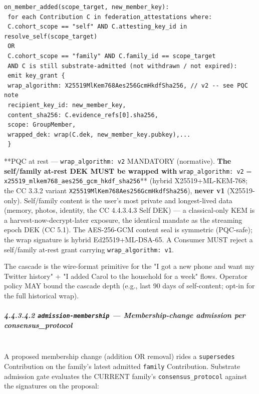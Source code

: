 \documentclass[11pt]{article}
\begin{document}
\begin{lstlisting}
on_member_added(scope_target, new_member_key):
 for each Contribution C in federation_attestations where:
 C.cohort_scope == "self" AND C.attesting_key_id in resolve_self(scope_target)
 OR
 C.cohort_scope == "family" AND C.family_id == scope_target
 AND C is still substrate-admitted (not withdrawn / not expired):
 emit key_grant {
 wrap_algorithm: X25519MlKem768Aes256GcmHkdfSha256, // v2 -- see PQC note
 recipient_key_id: new_member_key,
 content_sha256: C.evidence_refs[0].sha256,
 scope: GroupMember,
 wrapped_dek: wrap(C.dek, new_member_key.pubkey),...
 }
\end{lstlisting}

**PQC at rest — \texttt{wrap\_algorithm: v2} MANDATORY (normative).\textbf{ The self/family at-rest DEK MUST be wrapped with }\texttt{wrap\_algorithm: v2} = \texttt{x25519\_mlkem768\_aes256\_gcm\_hkdf\_sha256}** (hybrid X25519+ML-KEM-768; the CC 3.3.2 variant \texttt{X25519MlKem768Aes256GcmHkdfSha256}), \textbf{never v1} (X25519-only). Self/family content is the user's most private and longest-lived data (memory, photos, identity, the CC 4.4.3.4.3 Self DEK) — a classical-only KEM is a harvest-now-decrypt-later exposure, the identical mandate as the streaming epoch DEK (CC 5.1). The AES-256-GCM content seal is symmetric (PQC-safe); the wrap signature is hybrid Ed25519+ML-DSA-65. A Consumer MUST reject a self/family at-rest grant carrying \texttt{wrap\_algorithm: v1}.


The cascade is the wire-format primitive for the "I got a new phone and want my Twitter history" + "I added Carol to the household for a week" flows. Operator policy MAY bound the cascade depth (e.g., last 90 days of self-content; opt-in for the full historical wrap).


\subparagraph{4.4.3.4.2 \texttt{admission-membership} — Membership-change admission per consensus\_protocol}\mbox{}\\


A proposed membership change (addition OR removal) rides a \texttt{supersedes} Contribution on the family's latest admitted \texttt{family} Contribution. Substrate admission gate evaluates the CURRENT family's \texttt{consensus\_protocol} against the signatures on the proposal:
\end{document}
